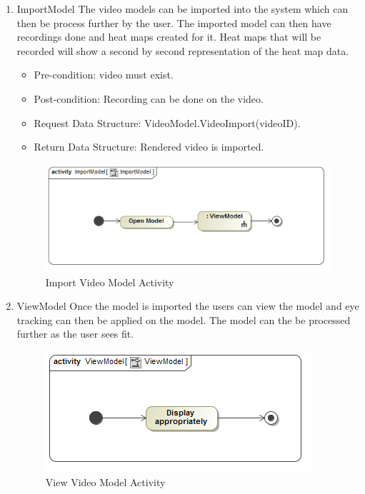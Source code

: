 		\begin{enumerate}
			\item{ImportModel}
			\newline
			The video models can be imported into the system which can then be process further by the user. The imported model can then have recordings done and heat maps created for it. Heat maps that will be recorded will show a second by second representation of the heat map data.
			\begin{itemize}
				\item Pre-condition: video must exist.
				\item Post-condition: Recording can be done on the video.
				\item Request Data Structure: VideoModel.VideoImport(videoID).
				\item Return Data Structure: Rendered video is imported.
			\end{itemize}
			
			\begin{figure}[!ht]
				\centering
				\includegraphics[scale=0.5]{Diagrams/Activity_Diagram__ImportModel__ImportModel.png}
				\caption{Import Video Model Activity}
			\end{figure}
			
			\item{ViewModel}
Once the model is imported the users can view the model and eye tracking can then be applied on the model. The model can the be processed further as the user sees fit.
			\begin{figure}
				\centering
				\includegraphics[scale=0.5]{Diagrams/Activity_Diagram__ViewModel__ViewModel.png}
				\caption{View Video Model Activity}
			\end{figure}
			

\end{enumerate}
